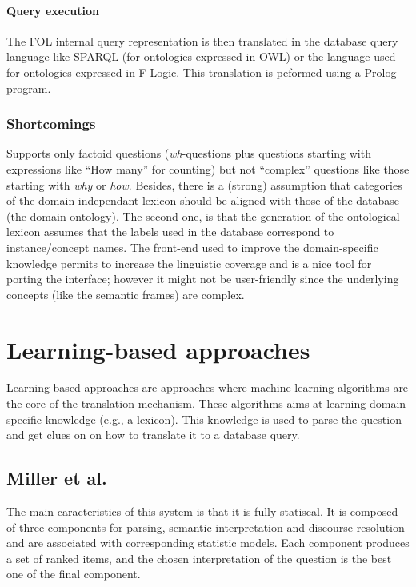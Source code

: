 \documentclass[10pt,journal,letterpaper,compsoc]{IEEEtran}
\begin{document}
\paragraph{Query execution}
The FOL internal query representation is then translated in the database query
language like SPARQL (for ontologies expressed in OWL) or the language used for
ontologies expressed in F-Logic.
This translation is peformed using a Prolog program.




\subsubsection{Shortcomings}
Supports only factoid questions ({\it wh}-questions plus questions starting
with expressions like ``How many'' for counting) but not ``complex'' questions
like those starting with {\it why} or {\it how}.
Besides, there is a (strong) assumption that categories of the
domain-independant lexicon should be aligned with those of the database (the
domain ontology). The second one, is that the generation of the ontological
lexicon assumes that the labels used in the database correspond to
instance/concept names.
The front-end used to improve the domain-specific knowledge permits to increase
the linguistic coverage and is a nice tool for porting the interface; however it
might not be user-friendly since the underlying concepts (like the semantic
frames) are complex.




\section{Learning-based approaches}
\label{sec:leraning-based}

Learning-based approaches are approaches where machine learning algorithms are
the core of the translation mechanism. 
These algorithms aims at learning domain-specific knowledge (e.g., a lexicon).
This knowledge is used to parse the question and get clues on on how to
translate it to a database query. 






\subsection{Miller et al.~\cite{Miller:1996:FSA:981863.981871}}
The main caracteristics of this system is that it is fully statiscal.
It is composed of three components for parsing, semantic interpretation and
discourse resolution and are associated with corresponding statistic models.
Each component produces a set of ranked items, and the chosen interpretation of
the question is the best one of the final component.
\end{document}
